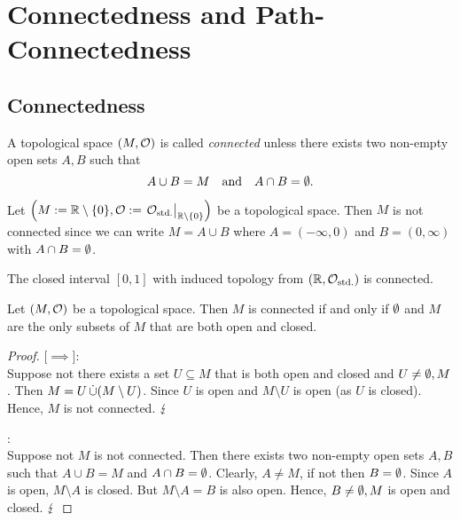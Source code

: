 \section{Connectedness and Path-Connectedness}

\subsection{Connectedness}
\begin{definition}\label{def:connected_space}
	A topological space \((M, \mathcal{O})\) is called \emph{connected} unless there exists two non-empty open sets \(A, B\) such that
	\begin{equation}
		A \cup B = M \quad \text{and} \quad A \cap B = \emptyset. \label{eq:connected_space}
	\end{equation}
\end{definition}

\begin{example}
	Let \(\qty(M := \R \setminus \qty{0}, \O := \eval{\Ostd}_{\R \setminus \qty{0}})\) be a topological space. Then \(M\) is not connected since we can write \(M = A \cup B\) where \(A = (-\infty, 0)\) and \(B = (0, \infty)\) with \(A \cap B = \emptyset\).
\end{example}

\begin{theorem}
	The closed interval \([0, 1]\) with induced topology from \((\mathbb R, \mathcal{O}_{\text{std.}})\) is connected.
\end{theorem}

\begin{theorem}
	Let \((M, \mathcal{O})\) be a topological space. Then \(M\) is connected if and only if \(\emptyset\) and \(M\) are the only subsets of \(M\) that are both open and closed.
\end{theorem}

\begin{proof}

	[\(\implies\)]:\\
	Suppose not there exists a set \(U \subseteq M\) that is both open and closed and \(U \neq \emptyset, M\). Then \(M = U \operatorname{\dot{\cup}} (M \setminus U)\). Since \(U\) is open and \(M \setminus U\) is open (as \(U\) is closed). Hence, \(M\) is not connected. \(\operatorname{\lightning}\)

	\noindent [\(\impliedby\)]:\\
	Suppose not \(M\) is not connected. Then there exists two non-empty open sets \(A, B\) such that \(A \cup B = M\) and \(A \cap B = \emptyset\). Clearly, \(A \ne M\), if not then \(B = \emptyset\). Since \(A\) is open, \(M \setminus A\) is closed. But \(M \setminus A = B\) is also open. Hence, \(B \ne \emptyset, M\) is open and closed. \(\operatorname{\lightning}\)
\end{proof}

